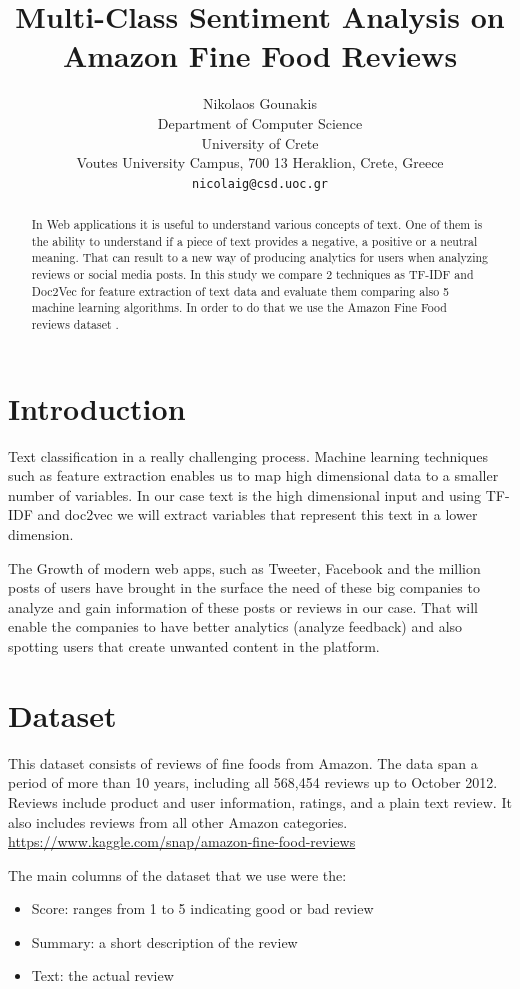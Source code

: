 \documentclass{article}
\title{Multi-Class Sentiment Analysis on Amazon Fine Food Reviews}
\author{%
  Nikolaos Gounakis\\
  Department of Computer Science\\
  University of Crete\\
  Voutes University Campus, 700 13 Heraklion, Crete, Greece\\
  \texttt{nicolaig@csd.uoc.gr} \\
}
\begin{document}
\maketitle

\begin{abstract}
In Web applications it is useful to understand various concepts of text. 
One of them is the ability to understand if a piece of text provides a negative,
a positive or a neutral meaning. That can result to a new way of producing analytics 
for users when analyzing reviews or social media posts. In this study we compare
2 techniques as \cite{studyPaper} TF-IDF \cite{tfidf} and Doc2Vec \cite{doc2vec} 
for feature extraction of text data and evaluate them comparing also 5 machine learning algorithms. 
In order to do that we use the Amazon Fine Food reviews dataset \cite{amzfood}.
\end{abstract}

\section{Introduction}
Text classification in a really challenging process. Machine learning techniques 
such as feature extraction enables us to map high dimensional data to a smaller 
number of variables. In our case text is the high dimensional input and using 
TF-IDF and doc2vec we will extract variables that represent this text in a 
lower dimension.

The Growth of modern web apps, such as Tweeter, Facebook and the million 
posts of users have brought in the surface the need of these big companies to 
analyze and gain information of these posts or reviews in our case. That will
enable the companies to have better analytics (analyze feedback) and also 
spotting users that create unwanted content in the platform. 

\section{Dataset}
This dataset consists of reviews of fine foods from Amazon. 
The data span a period of more than 10 years, including all 568,454 reviews 
up to October 2012. Reviews include product and user information, ratings, and a plain text review. 
It also includes reviews from all other Amazon categories.
\url{https://www.kaggle.com/snap/amazon-fine-food-reviews}

The main columns of the dataset that we use were the:
\begin{itemize}
  \item Score: ranges from 1 to 5 indicating good or bad review
  \item Summary: a short description of the review
  \item Text: the actual review
\end{itemize}
\end{document}

